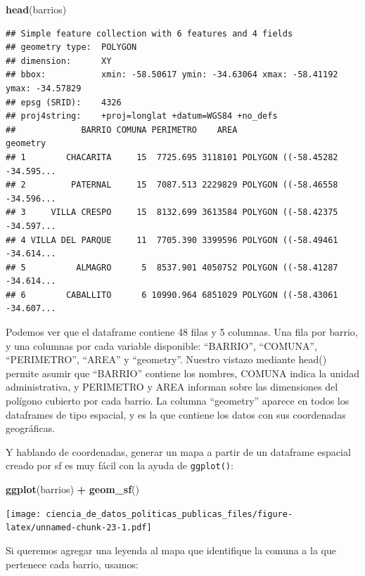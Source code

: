 \documentclass[]{book}
\newenvironment{Shaded}{\begin{snugshade}}{\end{snugshade}}
\newcommand{\KeywordTok}[1]{\textcolor[rgb]{0.13,0.29,0.53}{\textbf{#1}}}
\newcommand{\StringTok}[1]{\textcolor[rgb]{0.31,0.60,0.02}{#1}}
\newcommand{\OperatorTok}[1]{\textcolor[rgb]{0.81,0.36,0.00}{\textbf{#1}}}
\newcommand{\NormalTok}[1]{#1}
\begin{document}
\begin{Shaded}
\begin{Highlighting}[]
\KeywordTok{head}\NormalTok{(barrios)}
\end{Highlighting}
\end{Shaded}

\begin{verbatim}
## Simple feature collection with 6 features and 4 fields
## geometry type:  POLYGON
## dimension:      XY
## bbox:           xmin: -58.50617 ymin: -34.63064 xmax: -58.41192 ymax: -34.57829
## epsg (SRID):    4326
## proj4string:    +proj=longlat +datum=WGS84 +no_defs
##             BARRIO COMUNA PERIMETRO    AREA                       geometry
## 1        CHACARITA     15  7725.695 3118101 POLYGON ((-58.45282 -34.595...
## 2         PATERNAL     15  7087.513 2229829 POLYGON ((-58.46558 -34.596...
## 3     VILLA CRESPO     15  8132.699 3613584 POLYGON ((-58.42375 -34.597...
## 4 VILLA DEL PARQUE     11  7705.390 3399596 POLYGON ((-58.49461 -34.614...
## 5          ALMAGRO      5  8537.901 4050752 POLYGON ((-58.41287 -34.614...
## 6        CABALLITO      6 10990.964 6851029 POLYGON ((-58.43061 -34.607...
\end{verbatim}

Podemos ver que el dataframe contiene 48 filas y 5 columnas. Una fila
por barrio, y una columnas por cada variable disponible: ``BARRIO'',
``COMUNA'', ``PERIMETRO'', ``AREA'' y ``geometry''. Nuestro vistazo
mediante head() permite asumir que ``BARRIO'' contiene los nombres,
COMUNA indica la unidad administrativa, y PERIMETRO y AREA informan
sobre las dimensiones del polígono cubierto por cada barrio. La columna
``geometry'' aparece en todos los dataframes de tipo espacial, y es la
que contiene los datos con sus coordenadas geográficas.

Y hablando de coordenadas, generar un mapa a partir de un dataframe
espacial creado por sf es muy fácil con la ayuda de \texttt{ggplot()}:

\begin{Shaded}
\begin{Highlighting}[]
\KeywordTok{ggplot}\NormalTok{(barrios) }\OperatorTok{+}
\StringTok{    }\KeywordTok{geom_sf}\NormalTok{()}
\end{Highlighting}
\end{Shaded}

\texttt{[image: ciencia\_de\_datos\_politicas\_publicas\_files/figure-latex/unnamed-chunk-23-1.pdf]}

Si queremos agregar una leyenda al mapa que identifique la comuna a la
que pertenece cada barrio, usamos:
\end{document}
